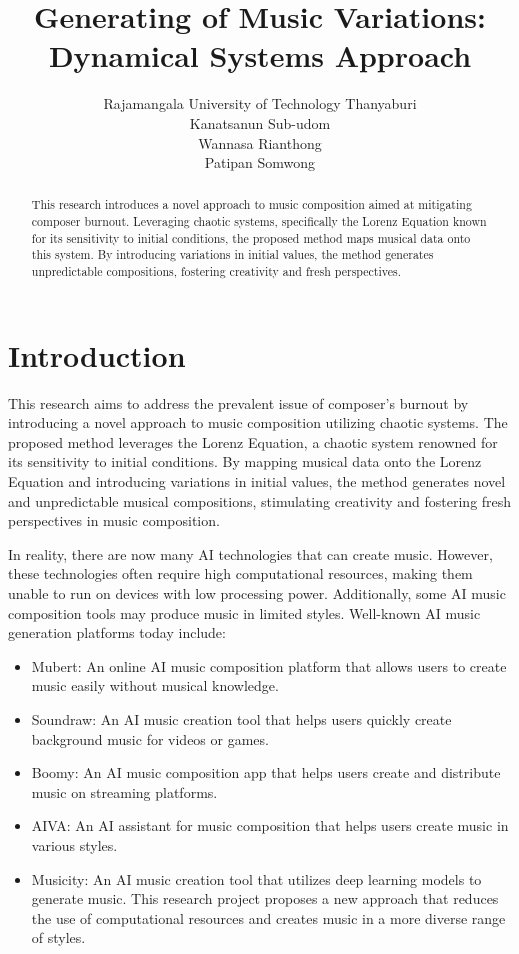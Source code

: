 \documentclass[11pt]{article}
\title{Generating of Music Variations: Dynamical Systems Approach}
\author{Rajamangala University of Technology Thanyaburi\\Kanatsanun Sub-udom\\Wannasa Rianthong\\Patipan Somwong}
\theoremstyle{definition}
\begin{document}
\maketitle
\begin{abstract}
This research introduces a novel approach to music composition aimed at mitigating composer burnout. Leveraging chaotic systems, specifically the Lorenz Equation known for its sensitivity to initial conditions, the proposed method maps musical data onto this system. By introducing variations in initial values, the method generates unpredictable compositions, fostering creativity and fresh perspectives. 
\end{abstract}

\section{Introduction}
This research aims to address the prevalent issue of composer's burnout by introducing a novel approach to music composition utilizing chaotic systems. The proposed method leverages the Lorenz Equation, a chaotic system renowned for its sensitivity to initial conditions. By mapping musical data onto the Lorenz Equation and introducing variations in initial values, the method generates novel and unpredictable musical compositions, stimulating creativity and fostering fresh perspectives in music composition.

In reality, there are now many AI technologies that can create music. However, these technologies often require high computational resources, making them unable to run on devices with low processing power. Additionally, some AI music composition tools may produce music in limited styles. Well-known AI music generation platforms \cite{bonnici_music_2021} today include:

\begin{itemize}
\item Mubert: An online AI music composition platform that allows users to create music easily without musical knowledge.
\item Soundraw: An AI music creation tool that helps users quickly create background music for videos or games.
\item Boomy: An AI music composition app that helps users create and distribute music on streaming platforms.
\item AIVA: An AI assistant for music composition that helps users create music in various styles.
\item Musicity: An AI music creation tool that utilizes deep learning models to generate music. This research project proposes a new approach that reduces the use of computational resources and creates music in a more diverse range of styles.
\end{itemize}
\end{document}
